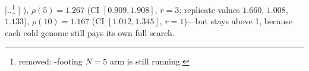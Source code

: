 \documentclass[letterpaper,twocolumn,10pt]{article}
\theoremstyle{definition}
\providecommand{\DIFadd}[1]{{\protect\color{blue} \sf #1}} %
\providecommand{\DIFdel}[1]{{\protect\color{red} [..\footnote{removed: #1} ]}} %
\providecommand{\DIFaddbegin}{} %
\providecommand{\DIFdelend}{} %
\providecommand{\DIFaddincludegraphics}[2][]{{\color{blue}\fbox{\DIFOincludegraphics[#1]{#2}}}} %
\DeclareRobustCommand{\DIFaddbegin}{\DIFOaddbegin \let\includegraphics\DIFaddincludegraphics} %
\DeclareRobustCommand{\DIFdelend}{\DIFOaddend \let\includegraphics\DIFOincludegraphics} %
\begin{document}
\DIFdel{-footing $N{=}5$ arm is still running.
}\DIFdelend \DIFaddbegin \DIFadd{), $\rho(5)=1.267$ (CI $[0.909, 1.908]$, $r{=}3$; replicate values $1.660$, $1.008$, $1.133$), $\rho(10)=1.167$ (CI $[1.012, 1.345]$, $r{=}1$)---but stays above 1, because each cold genome still pays its own full search.
}
\end{document}
